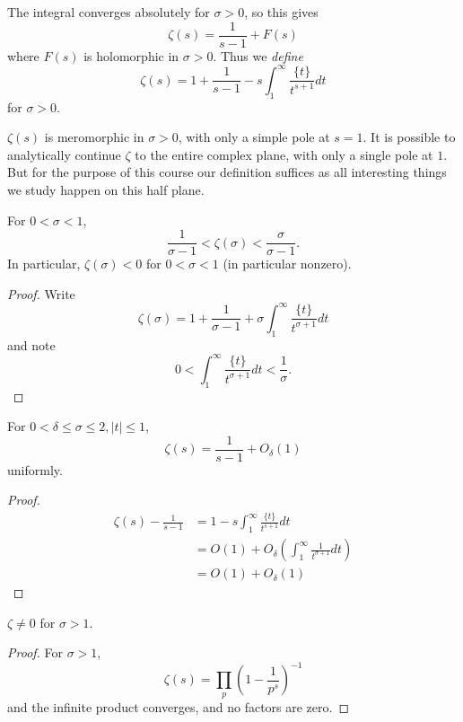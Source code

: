 \documentclass[a4paper]{article}
\theoremstyle{definition}
\begin{document}
The integral converges absolutely for \(\sigma > 0\), so this gives
\[
  \zeta(s) = \frac{1}{s - 1} + F(s)
\]
where \(F(s)\) is holomorphic in \(\sigma > 0\). Thus we \emph{define}
\[
  \zeta(s) = 1 + \frac{1}{s - 1} - s \int_1^\infty \frac{\{t\}}{t^{s + 1}} dt
\]
for \(\sigma > 0\).

\(\zeta(s)\) is meromorphic in \(\sigma > 0\), with only a simple pole at \(s = 1\). It is possible to analytically continue \(\zeta\) to the entire complex plane, with only a single pole at \(1\). But for the purpose of this course our definition suffices as all interesting things we study happen on this half plane.

\begin{corollary}
  For \(0 < \sigma < 1\),
  \[
    \frac{1}{\sigma - 1} < \zeta(\sigma) < \frac{\sigma}{\sigma - 1}.
  \]
  In particular, \(\zeta(\sigma) < 0\) for \(0 < \sigma < 1\) (in particular nonzero).
\end{corollary}

\begin{proof}
  Write
  \[
    \zeta(\sigma) = 1 + \frac{1}{\sigma - 1} + \sigma \int_1^\infty \frac{\{t\}}{t^{\sigma + 1}} dt
  \]
  and note
  \[
    0 < \int_1^\infty \frac{\{t\}}{t^{\sigma + 1}} dt < \frac{1}{\sigma}.
  \]
\end{proof}

\begin{corollary}
  For \(0 < \delta \leq \sigma \leq 2, |t| \leq 1\),
  \[
    \zeta(s) = \frac{1}{s - 1} + O_\delta(1)
  \]
  uniformly.
\end{corollary}

\begin{proof}
  \begin{align*}
    \zeta(s) - \frac{1}{s - 1}
    &= 1 - s \int_1^\infty \frac{\{t\}}{t^{s + 1}} dt \\
    &= O(1) + O_\delta(\int_1^\infty \frac{1}{t^{\sigma + 1}} dt) \\
    &= O(1) + O_\delta(1)
  \end{align*}
\end{proof}

\begin{lemma}
  \(\zeta \neq 0\) for \(\sigma > 1\).
\end{lemma}

\begin{proof}
  For \(\sigma > 1\),
  \[
    \zeta(s) = \prod_p \left( 1 - \frac{1}{p^s} \right)^{-1}
  \]
  and the infinite product converges, and no factors are zero.
\end{proof}
\end{document}
